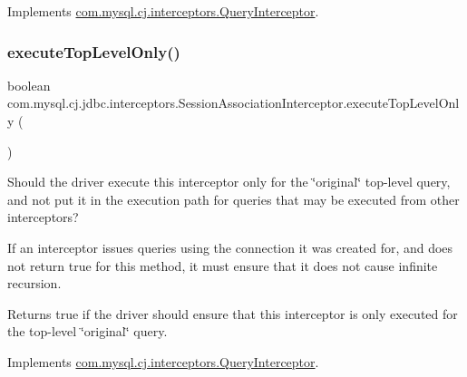 Implements \mbox{\hyperlink{interfacecom_1_1mysql_1_1cj_1_1interceptors_1_1_query_interceptor_a123809a91800f4f4409f5f37717bf9c8}{com.\+mysql.\+cj.\+interceptors.\+Query\+Interceptor}}.

\mbox{\label{classcom_1_1mysql_1_1cj_1_1jdbc_1_1interceptors_1_1_session_association_interceptor_a86d3be9b55a93bb96f17d85e39e623c9}} 
\subsubsection{\texorpdfstring{execute\+Top\+Level\+Only()}{executeTopLevelOnly()}}
{\footnotesize\ttfamily boolean com.\+mysql.\+cj.\+jdbc.\+interceptors.\+Session\+Association\+Interceptor.\+execute\+Top\+Level\+Only (\begin{DoxyParamCaption}{ }\end{DoxyParamCaption})}

Should the driver execute this interceptor only for the \char`\"{}original\char`\"{} top-\/level query, and not put it in the execution path for queries that may be executed from other interceptors?

If an interceptor issues queries using the connection it was created for, and does not return {\ttfamily true} for this method, it must ensure that it does not cause infinite recursion.

\begin{DoxyReturn}{Returns}
true if the driver should ensure that this interceptor is only executed for the top-\/level \char`\"{}original\char`\"{} query. 
\end{DoxyReturn}


Implements \mbox{\hyperlink{interfacecom_1_1mysql_1_1cj_1_1interceptors_1_1_query_interceptor_ab12edf90713df907ba400dbe3ba03ea6}{com.\+mysql.\+cj.\+interceptors.\+Query\+Interceptor}}.

\mbox{\label{classcom_1_1mysql_1_1cj_1_1jdbc_1_1interceptors_1_1_session_association_interceptor_adbf840ce7adf4bbc54efc2fa4d6a9987}} 

